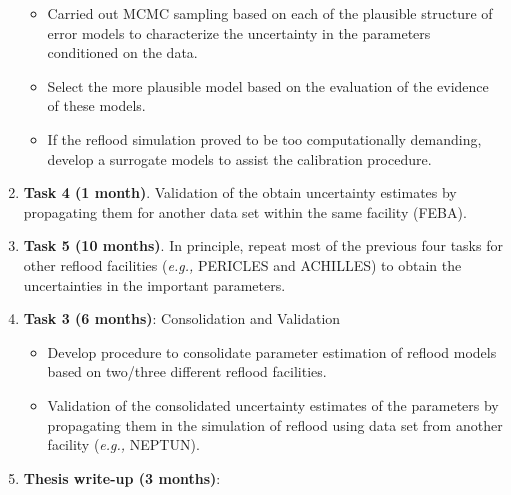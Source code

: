 \documentclass[11pt,titlepage]{article}
\begin{document}
\begin{enumerate}
\begin{itemize}
            \item Carried out MCMC sampling based on each of the plausible structure of error models to characterize the uncertainty in the parameters conditioned on the data.
            \item Select the more plausible model based on the evaluation of the evidence of these models.
            \item If the reflood simulation proved to be too computationally demanding, develop a surrogate models to assist the calibration procedure.
         \end{itemize}
   \item \textbf{Task 4 (1 month)}. 
   Validation of the obtain uncertainty estimates by propagating them for another data set within the same facility (FEBA).
   \item \textbf{Task 5 (10 months)}. 
   In principle, repeat most of the previous four tasks for other reflood facilities (\textit{e.g.,} PERICLES and ACHILLES) to obtain the uncertainties in the important parameters.   
   \item \textbf{Task 3 (6 months)}: Consolidation and Validation
        \begin{itemize}
            \item Develop procedure to consolidate parameter estimation of reflood models based on two/three different reflood facilities.
            \item Validation of the consolidated uncertainty estimates of the parameters by propagating them in the simulation of reflood using data set from another facility (\textit{e.g.,} NEPTUN).
        \end{itemize}
   \item \textbf{Thesis write-up (3 months)}: 
\end{enumerate}

%
%
%
%
\end{document}
